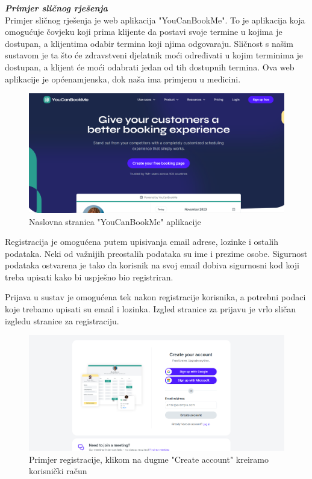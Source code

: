 		\textbf{\textit{Primjer sličnog rješenja}}\\
		
		Primjer sličnog rješenja je web aplikacija "YouCanBookMe". To je aplikacija koja omogućuje čovjeku koji prima klijente da postavi svoje termine u kojima je dostupan, a klijentima odabir termina koji njima odgovaraju. Sličnost s našim sustavom je ta što će zdravstveni djelatnik moći određivati u kojim terminima je dostupan, a klijent će moći odabrati jedan od tih dostupnih termina. Ova web aplikacije je općenamjenska, dok naša ima primjenu u medicini. 
		
		\begin{figure}[H]
			\includegraphics[scale=0.36]{slike/YouCanBookMe-Naslovna.PNG} %
			\centering
			\caption{Naslovna stranica "YouCanBookMe" aplikacije}
			\label{fig:promjene}
		\end{figure}
		
		Registracija je omogućena putem upisivanja email adrese, lozinke i ostalih podataka. Neki od važnijih preostalih podataka su ime i prezime osobe. Sigurnost podataka ostvarena je tako da korisnik na svoj email dobiva sigurnosni kod koji treba upisati kako bi uspješno bio registriran. 
		
		Prijava u sustav je omogućena tek nakon registracije korisnika, a potrebni podaci koje trebamo upisati su email i lozinka. Izgled stranice za prijavu je vrlo sličan izgledu stranice za registraciju.
		
		\begin{figure}[H]
			\includegraphics[scale=0.4]{slike/YouCanBookMe-Registracija1.PNG} %
			\centering
			\caption{Primjer registracije, klikom na dugme "Create account" kreiramo korisnički račun}
			\label{fig:promjene}
		\end{figure}
		
